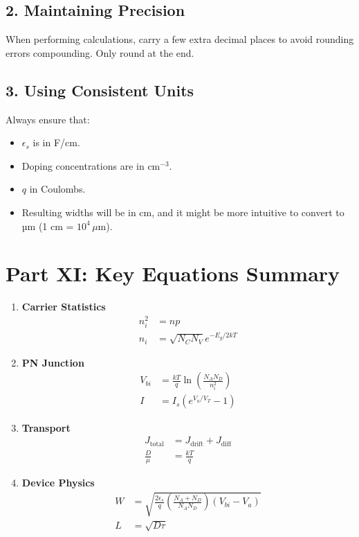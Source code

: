 \documentclass[12pt]{article}
\begin{document}
\subsection{2. Maintaining Precision}
When performing calculations, carry a few extra decimal places to avoid rounding errors compounding. Only round at the end.

\subsection{3. Using Consistent Units}
Always ensure that:
\begin{itemize}
    \item \( \epsilon_s \) is in F/cm.
    \item Doping concentrations are in \( \text{cm}^{-3} \).
    \item \( q \) in Coulombs.
    \item Resulting widths will be in cm, and it might be more intuitive to convert to µm (1 cm = \( 10^4\, \mu\text{m} \)).
\end{itemize}

\section{Part XI: Key Equations Summary}

\begin{enumerate}
    \item \textbf{Carrier Statistics}
    \begin{align*}
    n_i^2 &= np \\
    n_i &= \sqrt{N_C N_V} e^{-E_g/2kT}
    \end{align*}
    
    \item \textbf{PN Junction}
    \begin{align*}
    V_{bi} &= \frac{kT}{q} \ln\left(\frac{N_A N_D}{n_i^2}\right) \\
    I &= I_s \left( e^{V_a/V_T} - 1 \right)
    \end{align*}
    
    \item \textbf{Transport}
    \begin{align*}
    J_{\text{total}} &= J_{\text{drift}} + J_{\text{diff}} \\
    \frac{D}{\mu} &= \frac{kT}{q}
    \end{align*}
    
    \item \textbf{Device Physics}
    \begin{align*}
    W &= \sqrt{\frac{2\epsilon_s}{q} \left( \frac{N_A + N_D}{N_A N_D} \right) \left( V_{bi} - V_a \right)} \\
    L &= \sqrt{D\tau}
    \end{align*}
\end{enumerate}
\end{document}
